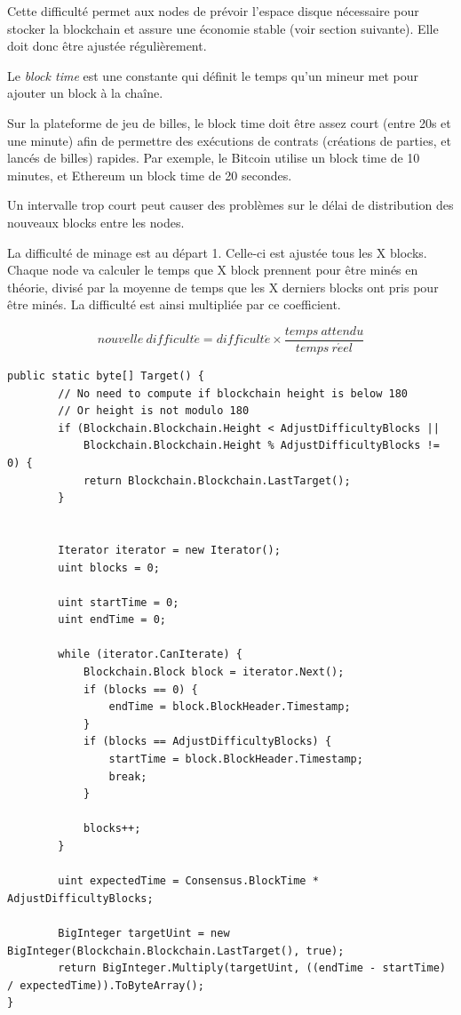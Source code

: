 \documentclass{article}
\begin{document}
Cette difficulté permet aux nodes de prévoir l’espace disque nécessaire pour stocker la blockchain et assure une économie stable (voir section suivante). Elle doit donc être ajustée régulièrement.

Le \textit{block time} est une constante qui définit le temps qu’un mineur met pour ajouter un block à la chaîne.

Sur la plateforme de jeu de billes, le block time doit être assez court (entre 20s et une minute) afin de permettre des exécutions de contrats (créations de parties, et lancés de billes) rapides. Par exemple, le Bitcoin utilise un block time de 10 minutes, et Ethereum un block time de 20 secondes.

Un intervalle trop court peut causer des problèmes sur le délai de distribution des nouveaux blocks entre les nodes.

La difficulté de minage est au départ 1. Celle-ci est ajustée tous les X
blocks. Chaque node va calculer le temps que X block prennent pour être minés en théorie, divisé par la moyenne de temps que les X derniers blocks ont pris pour être minés. La difficulté est ainsi multipliée par ce coefficient.

\[ nouvelle\ difficult\acute{e} = difficult\acute{e} \times \frac{temps\ attendu}{temps\ r\acute{e}el} \]

\hfill
\begin{verbatim}
public static byte[] Target() {
    	// No need to compute if blockchain height is below 180
    	// Or height is not modulo 180
    	if (Blockchain.Blockchain.Height < AdjustDifficultyBlocks ||
            Blockchain.Blockchain.Height % AdjustDifficultyBlocks != 0) {
            return Blockchain.Blockchain.LastTarget();
    	}
    	
    	
    	Iterator iterator = new Iterator();
    	uint blocks = 0;
    
    	uint startTime = 0;
    	uint endTime = 0;
    
    	while (iterator.CanIterate) {
    		Blockchain.Block block = iterator.Next();
    		if (blocks == 0) {
    			endTime = block.BlockHeader.Timestamp;
    		}
    		if (blocks == AdjustDifficultyBlocks) {
    			startTime = block.BlockHeader.Timestamp;
    			break;
    		}
    		
    		blocks++;
    	}
    
    	uint expectedTime = Consensus.BlockTime * AdjustDifficultyBlocks;
    
    	BigInteger targetUint = new BigInteger(Blockchain.Blockchain.LastTarget(), true);
    	return BigInteger.Multiply(targetUint, ((endTime - startTime) / expectedTime)).ToByteArray();
}
\end{verbatim}
\end{document}
